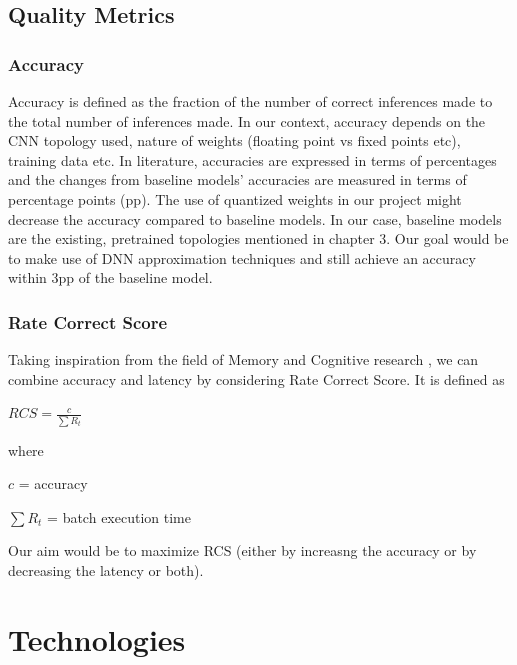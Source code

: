 \documentclass[titlepage]{report}
\begin{document}
\section{Quality Metrics}
\subsection{Accuracy}
Accuracy is defined as the fraction of the number of correct inferences made to the total number of inferences made. In our context, accuracy depends on the CNN topology used, nature of weights (floating point vs fixed points etc), training data etc. 
In literature, accuracies are expressed in terms of percentages and the changes from baseline models’ accuracies are measured in terms of percentage points (pp). 
The use of quantized weights in our project might decrease the accuracy compared to baseline models. In our case, baseline models are the existing, pretrained topologies mentioned in chapter 3. Our goal would be to make use of DNN approximation techniques and still achieve an accuracy within 3pp of the baseline model.


\subsection{Rate Correct Score}
Taking inspiration from the field of Memory and  Cognitive research , we can combine accuracy and latency by considering Rate Correct Score. It is defined as    

$RCS = \frac{c}{\sum R_t}$    

where   

$c$ = accuracy    

      $\sum R_t$ = batch execution time  
      
Our aim would be to maximize RCS (either by increasng the accuracy or by decreasing the latency or both).




\chapter{Technologies}
\end{document}
